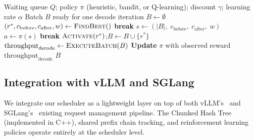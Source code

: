 \begin{algorithm}[H]
\caption{$\textsc{BuildBatch}()$}
\label{alg:rl_batch}
\begin{algorithmic}[1]
\Require Waiting queue $Q$; policy $\pi$ (heuristic, bandit, or Q-learning); discount $\gamma$; learning rate $\alpha$
\Ensure Batch $B$ ready for one decode iteration
\State $B \gets \emptyset$
    \State $(r^*, c_{\mathrm{before}}, c_{\mathrm{after}}, w) \gets \textsc{FindBest}()$
     \textbf{break} \EndIf
    \State $s \gets (|B|,\; c_{\mathrm{before}},\; c_{\mathrm{after}},\; w)$
    \State $a \gets \pi(s)$ 
     \textbf{break} \EndIf
    \State $\textsc{Activate}(r^*)$;\quad $B \gets B \cup \{r^*\}$
\EndWhile
\State $\text{throughput}_{\mathrm{decode}} \gets \textsc{ExecuteBatch}(B)$
\State \textbf{Update} $\pi$ with observed reward $\text{throughput}_{\mathrm{decode}}$ 
\State \Return $B$
\end{algorithmic}
\end{algorithm}

\subsection{Integration with vLLM and SGLang}
We integrate our scheduler as a lightweight layer on top of both vLLM's~\cite{kwon2023efficient} and SGLang's~\cite{zheng2024sglangefficientexecutionstructured} existing request management pipeline. The Chunked Hash Tree (implemented in C++), shared prefix chain tracking, and reinforcement learning policies operate entirely at the scheduler level.